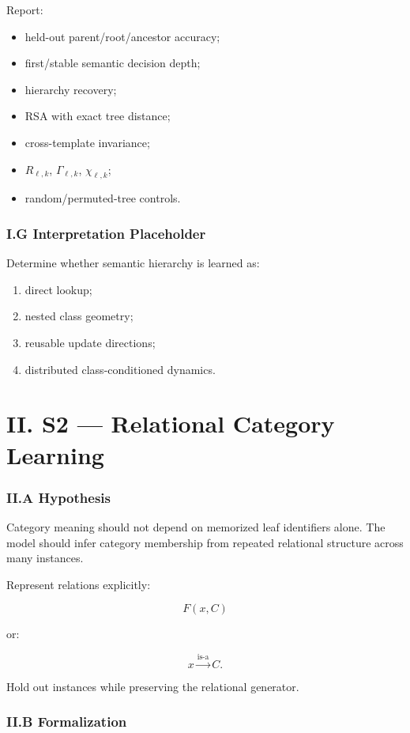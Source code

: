\documentclass[10pt]{article}
\begin{document}
Report:

\begin{itemize}
\item held-out parent/root/ancestor accuracy;
\item first/stable semantic decision depth;
\item hierarchy recovery;
\item RSA with exact tree distance;
\item cross-template invariance;
\item \(R_{\ell,k}\), \(\Gamma_{\ell,k}\), \(\chi_{\ell,k}\);
\item random/permuted-tree controls.
\end{itemize}

\section{I.G Interpretation Placeholder}

Determine whether semantic hierarchy is learned as:

\begin{enumerate}
\item direct lookup;
\item nested class geometry;
\item reusable update directions;
\item distributed class-conditioned dynamics.
\end{enumerate}

\part{II. S2 --- Relational Category Learning}

\section{II.A Hypothesis}

Category meaning should not depend on memorized leaf identifiers alone. The model should infer category membership from repeated relational structure across many instances.

Represent relations explicitly:

\[
F(x,C)
\]

or:

\[
x \xrightarrow{\text{is-a}} C.
\]

Hold out instances while preserving the relational generator.

\section{II.B Formalization}
\end{document}
